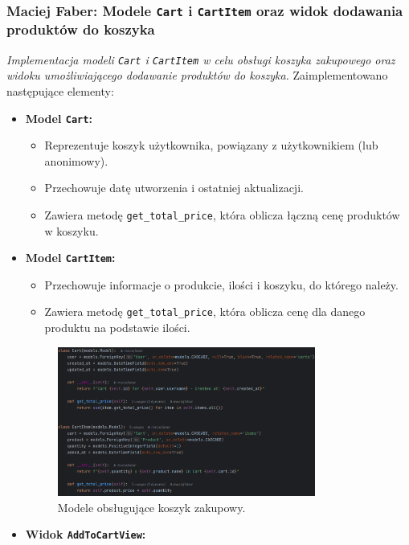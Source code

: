 \documentclass[12pt,a4paper,oneside]{article}
\theoremstyle{definition}
\numberwithin{equation}{section}
\begin{document}
\subsubsection{Maciej Faber: Modele \texttt{Cart} i \texttt{CartItem} oraz widok dodawania produktów do koszyka}
\label{section:1.3.39}
\textit{
Implementacja modeli \texttt{Cart} i \texttt{CartItem} w celu obsługi koszyka zakupowego oraz widoku umożliwiającego dodawanie produktów do koszyka.
}
Zaimplementowano następujące elementy:
\begin{itemize}
    \item \textbf{Model \texttt{Cart}:}
    \begin{itemize}
        \item Reprezentuje koszyk użytkownika, powiązany z użytkownikiem (lub anonimowy).
        \item Przechowuje datę utworzenia i ostatniej aktualizacji.
        \item Zawiera metodę \texttt{get\_total\_price}, która oblicza łączną cenę produktów w koszyku.
    \end{itemize}
    \item \textbf{Model \texttt{CartItem}:}
    \begin{itemize}
        \item Przechowuje informacje o produkcie, ilości i koszyku, do którego należy.
        \item Zawiera metodę \texttt{get\_total\_price}, która oblicza cenę dla danego produktu na podstawie ilości.
    \end{itemize}
    \begin{figure}[H]
        \centering
        \includegraphics[width=0.8\textwidth]{images/krzysztofBImages/cart_models.png}
        \caption{Modele obsługujące koszyk zakupowy.}
        \label{fig:cart_models}
    \end{figure}
    \item \textbf{Widok \texttt{AddToCartView}:}

\end{itemize}
\end{document}
